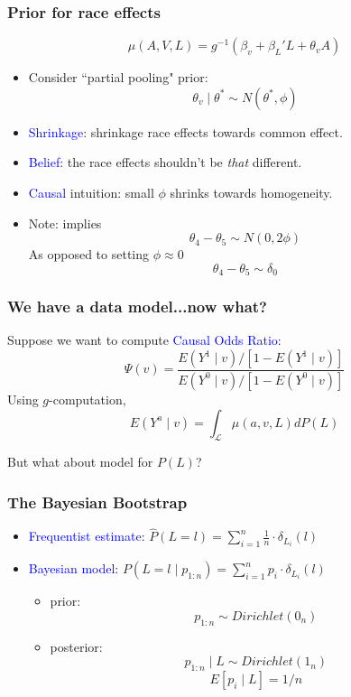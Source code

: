 \documentclass[xcolor=x11names,compress]{beamer}
\renewcommand{\(}{\begin{columns}}
\renewcommand{\)}{\end{columns}}
\newcommand{\<}[1]{\begin{column}{#1}}
\renewcommand{\>}{\end{column}}
\begin{document}
\begin{frame}
	\frametitle{Prior for race effects}
	$$ \mu(A, V, L) = g^{-1}( \beta_v + \beta_L' L +  \theta_v A ) $$
	
	\begin{itemize}
	\item Consider ``partial pooling" prior: 
	\pause
	$$ \theta_v \mid \theta^* \sim N(\theta^*, \phi)  $$
	\item \textcolor{blue}{Shrinkage}: shrinkage race effects towards common effect. 
	\item \textcolor{blue}{Belief}: the race effects shouldn't be \textit{that} different. 
	\item \textcolor{blue}{Causal} intuition: small $\phi$ shrinks towards homogeneity.
	\pause
	\item Note: implies 
	$$\theta_4 - \theta_5 \sim N(0, 2\phi )$$
	As opposed to setting $\phi \approx 0$
	$$ \theta_4 - \theta_5 \sim \delta_0 $$
	\end{itemize}	
\end{frame}

\begin{frame}
	\frametitle{We have a data model...now what?}
	
	Suppose we want to compute \textcolor{blue}{Causal Odds Ratio}:
	$$ \Psi(v) = \frac{ E(Y^1 \mid v)/[1-E(Y^1 \mid v)] }{E(Y^0 \mid v)/[1-E(Y^0 \mid v)] } $$
	\pause
	Using $g$-computation, 
	$$ E(Y^a \mid v ) = \int_{\mathcal{L}} \mu(a, v, L) dP(L) $$
	
	But what about model for $P(L)$?
\end{frame}

\begin{frame}
	\frametitle{The Bayesian Bootstrap}
	
	\begin{itemize}
	 \item  \textcolor{blue}{Frequentist estimate}: $\hat P(L=l) = \sum_{i=1}^n \frac{1}{n} \cdot \delta_{L_i} (l)$
	 \pause
	 \item \textcolor{blue}{Bayesian model}: $P(L=l \mid p_{1:n}) = \sum_{i=1}^n p_i \cdot \delta_{L_i} (l)$
	 \pause
	 \begin{itemize}
	 	\item prior: 
		$$p_{1:n} \sim Dirichlet(0_n)$$
		\pause
		\item posterior: 
		$$p_{1:n} \mid L \sim Dirichlet(1_n)$$
		$$E[p_i \mid L] = 1/n $$
	 \end{itemize}
	\end{itemize}	
\end{frame}
\end{document}
